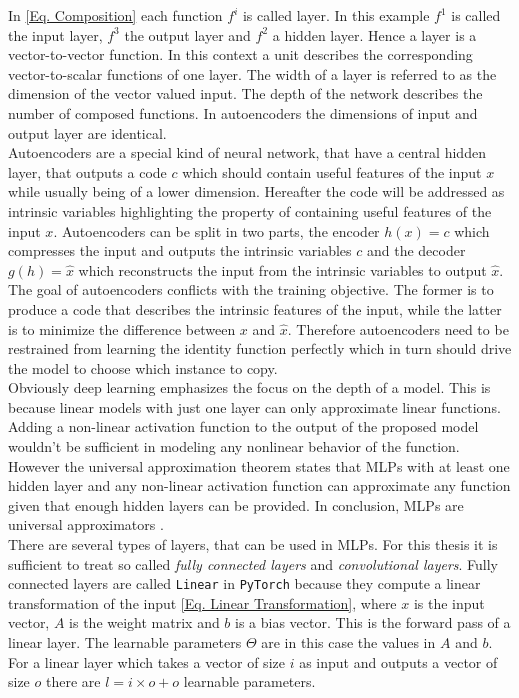  In \cref{Eq. Composition} each function \(f^i\) is called layer. In this example \(f^1\) is called the input layer, \(f^3\) the output layer and \(f^2\) a hidden layer. Hence a layer is a vector-to-vector function. In this context a unit describes the corresponding vector-to-scalar functions of one layer. The width of a layer is referred to as the dimension of the vector valued input. The depth of the network describes the number of composed functions. In autoencoders the dimensions of input and output layer are identical.\\Autoencoders are a special kind of neural network, that have a central hidden layer, that outputs a code \(c\) which should contain useful features of the input \(x\) while usually being of a lower dimension. Hereafter the code will be addressed as intrinsic variables highlighting the property of containing useful features of the input \(x\). Autoencoders can be split in two parts, the encoder \(h(x) = c\) which compresses the input and outputs the intrinsic variables \(c\) and the decoder \(g(h) = \hat{x}\) which reconstructs the input from the intrinsic variables to output \(\hat{x}\). The goal of autoencoders conflicts with the training objective. The former is to produce a code that describes the intrinsic features of the input, while the latter is to minimize the difference between \(x\) and \(\hat{x}\). Therefore autoencoders need to be restrained from learning the identity function perfectly which in turn should drive the model to choose which instance to copy.\\
Obviously deep learning emphasizes the focus on the depth of a model. This is because linear models with just one layer can only approximate linear functions. Adding a non-linear activation function to the output of the proposed model wouldn't be sufficient in modeling any nonlinear behavior of the function. However the universal approximation theorem \cite{Hornik1989} states that MLPs with at least one hidden layer and any non-linear activation function can approximate any function given that enough hidden layers can be provided. In conclusion, MLPs are universal approximators \cite{Goodfellow}.\\
There are several types of layers, that can be used in MLPs. For this thesis it is sufficient to treat so called \textit{fully connected layers} and \textit{convolutional layers}.
Fully connected layers are called \texttt{Linear}\cite{bibid} in \texttt{PyTorch}\cite{bibid} because they compute a linear transformation of the input \cref{Eq. Linear Transformation}, where \(x\) is the input vector, \(A\) is the weight matrix and \(b\) is a bias vector. This is the forward pass of a linear layer. The learnable parameters \(\Theta\) are in this case the values in \(A\) and \(b\). For a linear layer which takes a vector of size \(i\) as input and outputs a vector of size \(o\) there are \(l = i \times o + o\) learnable parameters. 
